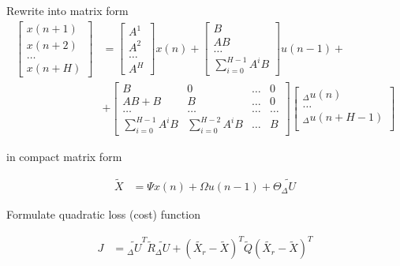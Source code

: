 \documentclass[12pt,twoside,onecolumn,openany,extrafontsizes,dvipsnames]{memoir}
\begin{document}
        Rewrite into matrix form
        \begin{align*}
            \begin{bmatrix}
            x(n+1) \\
            x(n+2) \\
            \dots \\
            x(n+H)
            \end{bmatrix} &= 
            \begin{bmatrix}
            A^1 \\
            A^2 \\
            \dots \\
            A^H
            \end{bmatrix} x(n) +
            \begin{bmatrix}
            B \\
            AB \\
            \dots \\
            \sum_{i=0}^{H-1} A^iB
            \end{bmatrix} u(n-1) + \\
            &+
            \begin{bmatrix}
            B  & 0 & \dots & 0 \\
            AB + B & B & \dots & 0 \\
            \dots & \dots & \dots & \dots \\
            \sum_{i=0}^{H-1}A^iB & \sum_{i=0}^{H-2}A^iB & \dots & B
            \end{bmatrix}
            \begin{bmatrix}
            _\Delta u(n) \\
            \dots \\
            _\Delta u(n + H - 1) \\
            \end{bmatrix} 
        \end{align*}

        in compact matrix form

        \begin{align*}
            \tilde{X} &= \Psi x(n) + \Omega u(n-1) + \Theta \tilde{_\Delta U}
        \end{align*}


        Formulate quadratic loss (cost) function

        \begin{align*}
            J &= \tilde{_\Delta U}^T \tilde{R} \tilde{_\Delta U} 
                        + (\tilde{X_r} - \tilde{X})^T \tilde{Q} (\tilde{X_r} - \tilde{X})^T \\
        \end{align*}
\end{document}
